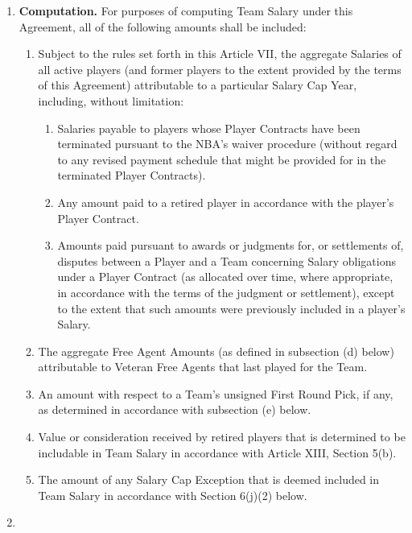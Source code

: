 \documentclass[
]{book}
\providecommand{\tightlist}{%
  \setlength{\itemsep}{0pt}\setlength{\parskip}{0pt}}
\begin{document}
\begin{enumerate}
\def\labelenumi{(\alph{enumi})}
\tightlist
\item
  \textbf{Computation.} For purposes of computing Team Salary under this Agreement, all of the following amounts shall be included:

  \begin{enumerate}
  \def\labelenumii{(\arabic{enumii})}
  \tightlist
  \item
    Subject to the rules set forth in this Article VII, the aggregate Salaries of all active players (and former players to the extent provided by the terms of this Agreement) attributable to a particular Salary Cap Year, including, without limitation:

    \begin{enumerate}
    \def\labelenumiii{(\roman{enumiii})}
    \tightlist
    \item
      Salaries payable to players whose Player Contracts have been terminated pursuant to the NBA's waiver procedure (without regard to any revised payment schedule that might be provided for in the terminated Player Contracts).
    \item
      Any amount paid to a retired player in accordance with the player's Player Contract.
    \item
      Amounts paid pursuant to awards or judgments for, or settlements of, disputes between a Player and a Team concerning Salary obligations under a Player Contract (as allocated over time, where appropriate, in accordance with the terms of the judgment or settlement), except to the extent that such amounts were previously included in a player's Salary.
    \end{enumerate}
  \item
    The aggregate Free Agent Amounts (as defined in subsection (d) below) attributable to Veteran Free Agents that last played for the Team.
  \item
    An amount with respect to a Team's unsigned First Round Pick, if any, as determined in accordance with subsection (e) below.
  \item
    Value or consideration received by retired players that is determined to be includable in Team Salary in accordance with Article XIII, Section 5(b).
  \item
    The amount of any Salary Cap Exception that is deemed included in Team Salary in accordance with Section 6(j)(2) below.
  \end{enumerate}
\item

\end{enumerate}
\end{document}
